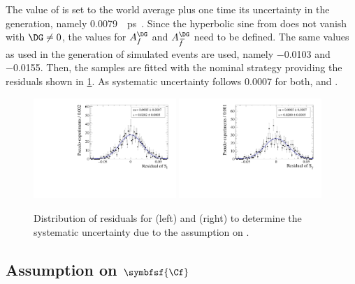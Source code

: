 The value of \DG is set to the world average plus one time its uncertainty in the generation, namely \SI{0.0079}{\per\pico\second}~\cite{HFLAV2016}.
Since the hyperbolic sine from  does not vanish with $\DG\neq0$, the values for $A_f^{\DG}$ and $A_{\kern 1.5pt\overline{\kern -1.5pt f\kern 1.5pt}}^{\DG}$ need to be defined.
The same values as used in the generation of simulated events are used, namely \num{-0.0103} and \num{-0.0155}.
Then, the samples are fitted with the nominal strategy providing the residuals shown in \cref{fig:systUncertDG}.
As systematic uncertainty follows \num{0.0007} for both, \Sf and \Sfbar.
\begin{figure}[tbp]
    \centering
    \includegraphics[width=0.48\textwidth]{10Systematics/figs/DG_Sf_res.pdf}
    \includegraphics[width=0.48\textwidth]{10Systematics/figs/DG_Sfbar_res.pdf}
    \caption{Distribution of residuals for \Sf (left) and \Sfbar (right) to determine the systematic uncertainty due to the assumption on \DG.}
    \label{fig:systUncertDG}
\end{figure}

\subsection*{Assumption on $\symbfsf{\Cf}$}

